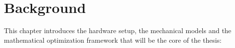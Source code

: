 \documentclass[/home/francois/latex/report/main.tex]{subfiles}
\begin{document}
\chapter{Background}
\label{chapter:background}

This chapter introduces the hardware setup, the mechanical models and the mathematical optimization framework that will be the core of the thesis:
%
% 
%
%
%
%
%
\end{document}
